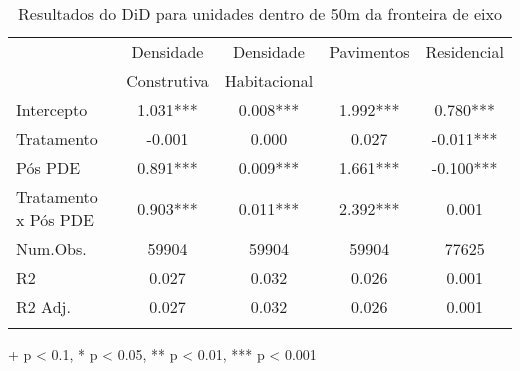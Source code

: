 \begin{table}[!t]
\caption{Resultados do DiD para unidades dentro de 50m da fronteira de eixo} 
\fontsize{10.0pt}{12.4pt}\selectfont
\begin{tabular*}{\linewidth}{@{\extracolsep{\fill}}lcccc}
\toprule
& Densidade & Densidade & Pavimentos & Residencial \\ 
& Construtiva & Habitacional &  &  \\ 
\midrule\addlinespace[2.5pt]
Intercepto & 1.031*** & 0.008*** & 1.992*** & 0.780*** \\ 
Tratamento & -0.001 & 0.000 & 0.027 & -0.011*** \\ 
Pós PDE & 0.891*** & 0.009*** & 1.661*** & -0.100*** \\ 
{Tratamento x Pós PDE} & {0.903***} & {0.011***} & {2.392***} & {0.001} \\ 
\midrule
Num.Obs. & 59904 & 59904 & 59904 & 77625 \\ 
R2 & 0.027 & 0.032 & 0.026 & 0.001 \\ 
R2 Adj. & 0.027 & 0.032 & 0.026 & 0.001 \\ 
\bottomrule\vspace{0pt}
\end{tabular*}
\label{tab:did-IPTU}
\begin{minipage}{\linewidth}
+ p < 0.1, * p < 0.05, ** p < 0.01, *** p < 0.001\\
\end{minipage}
\end{table}

